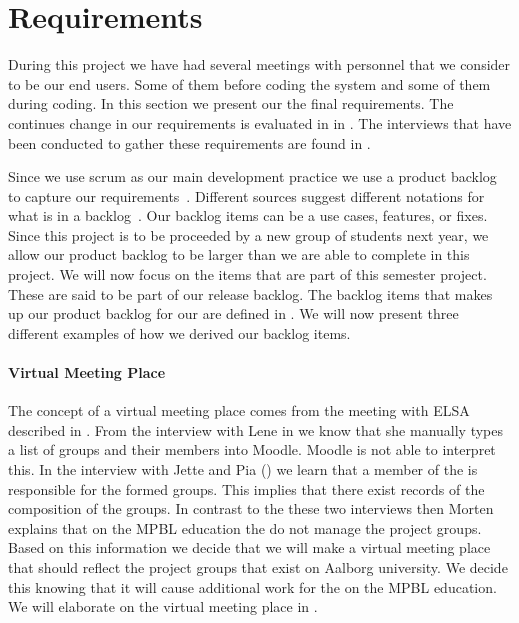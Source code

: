 \section{Requirements}
\label{sec:requirements}
During this project we have had several meetings with personnel that we consider to be our end users.
Some of them before coding the system and some of them during coding.
In this section we present our the final requirements.
The continues change in our requirements is evaluated in  in .
The interviews that have been conducted to gather these requirements are found in .

Since we use scrum as our main development practice we use a product backlog to capture our requirements~\cite[p.~114]{Larman04}.
Different sources suggest different notations for what is in a backlog~\cite[p.~17]{scrumchecklist}\cite[pp.~123-124]{Larman04}.
Our backlog items can be a use cases, features, or fixes.
Since this project is to be proceeded by a new group of students next year, we allow our product backlog to be larger than we are able to complete in this project.
We will now focus on the items that are part of this semester project.
These are said to be part of our release backlog.
The backlog items that makes up our product backlog for our \subsystem{} are defined in .
We will now present three different examples of how we derived our backlog items.

\paragraph{Virtual Meeting Place}
The concept of a virtual meeting place comes from the meeting with ELSA described in . 
From the interview with Lene in  we know that she manually types a list of groups and their members into Moodle.
Moodle is not able to interpret this. 
In the interview with Jette and Pia () we learn that a member of the \admpers{} is responsible for the formed groups. 
This implies that there exist records of the composition of the groups.   
In contrast to the these two interviews then Morten explains that on the MPBL education the \admpers{} do not manage the project groups.
Based on this information we decide that we will make a virtual meeting place that should reflect the project groups that exist on Aalborg university. 
We decide this knowing that it will cause additional work for the \admpers{} on the MPBL education. 
We will elaborate on the virtual meeting place in .

